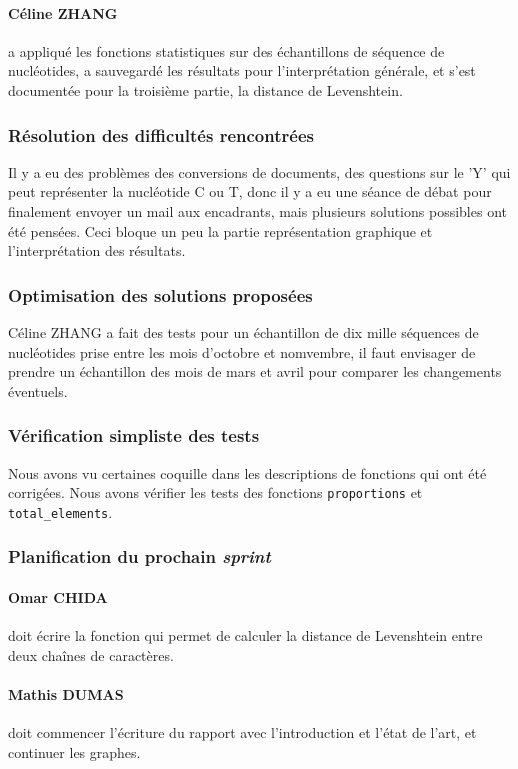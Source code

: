 \paragraph*{Céline ZHANG} a appliqué les fonctions statistiques sur des échantillons de séquence de nucléotides, a sauvegardé les résultats pour l'interprétation générale, et s'est documentée pour la troisième partie, la distance de Levenshtein.

\subsubsection*{Résolution des difficultés rencontrées}
Il y a eu des problèmes des conversions de documents, des questions sur le 'Y' qui peut représenter la nucléotide C ou T, donc il y a eu une séance de débat pour finalement envoyer un mail aux encadrants, mais plusieurs solutions possibles ont été pensées. Ceci bloque un peu la partie représentation graphique et l'interprétation des résultats.

\subsubsection*{Optimisation des solutions proposées}
Céline ZHANG a fait des tests pour un échantillon de dix mille séquences de nucléotides prise entre les mois d'octobre et nomvembre, il faut envisager de prendre un échantillon des mois de mars et avril pour comparer les changements éventuels.

\subsubsection*{Vérification simpliste des tests}
Nous avons vu certaines coquille dans les descriptions de fonctions qui ont été corrigées. Nous avons vérifier les tests des fonctions \texttt{proportions} et \texttt{total\_elements}.

\subsubsection*{Planification du prochain \textsl{sprint}}
\paragraph*{Omar CHIDA} doit écrire la fonction qui permet de calculer la distance de Levenshtein entre deux chaînes de caractères.

\paragraph*{Mathis DUMAS} doit commencer l'écriture du rapport avec l'introduction et l'état de l'art, et continuer les graphes.

